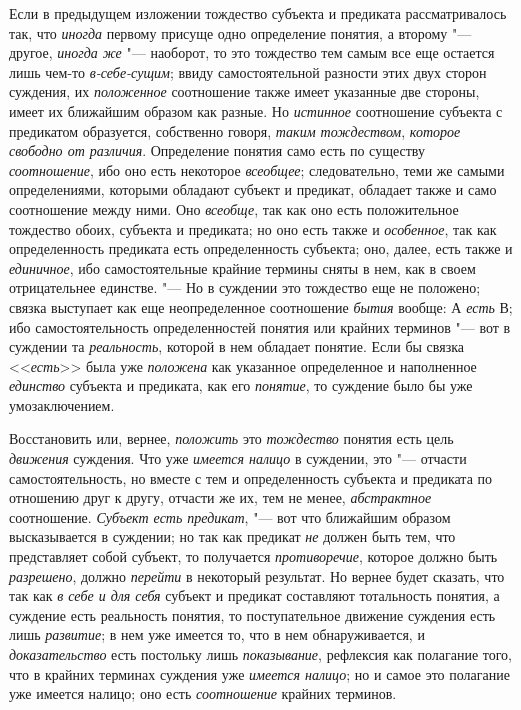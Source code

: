 Если в предыдущем изложении тождество субъекта и предиката
рассматривалось так, что {\em иногда}
первому присуще одно определение понятия, а второму
"--- другое, {\em иногда же}
"--- наоборот, то это тождество тем самым все еще остается лишь
чем-то {\em в-себе-сущим};
ввиду самостоятельной разности этих двух сторон суждения, их
{\em положенное}
соотношение также имеет указанные две стороны, имеет их
ближайшим образом как разные. Но
{\em истинное}
соотношение субъекта с предикатом образуется, собственно
говоря, {\em таким тождеством},
{\em которое свободно от различия}.
Определение понятия само есть по существу
{\em соотношение}, ибо
оно есть некоторое {\em всеобщее};
следовательно, теми же самыми определениями, которыми
обладают субъект и предикат, обладает также и само соотношение между ними.
Оно {\em всеобще}, так
как оно есть положительное тождество обоих, субъекта и предиката; но оно
есть также и
{\em особенное},
так как определенность предиката есть определенность
субъекта; оно, далее, есть также и
{\em единичное}, ибо
самостоятельные крайние термины сняты в нем, как в своем отрицательнее
единстве. "--- Но в суждении это тождество еще не положено;
связка выступает как еще неопределенное соотношение
{\em бытия} вообще: А
{\em есть} В; ибо
самостоятельность определенностей понятия или крайних терминов
"--- вот в суждении та
{\em реальность}, которой
в нем обладает понятие. Если бы связка
<<{\em есть}>> была уже
{\em положена} как
указанное определенное и наполненное
{\em единство} субъекта и
предиката, как его {\em понятие},
то суждение было бы уже умозаключением.

Восстановить или, вернее,
{\em положить} это
{\em тождество} понятия
есть цель {\em движения}
суждения. Что уже
{\em имеется налицо }в
суждении, это "--- отчасти самостоятельность, но вместе с тем и
определенность субъекта и предиката по отношению друг к другу, отчасти же
их, тем не менее, {\em абстрактное}
соотношение. {\em Субъект
есть предикат}, "--- вот что ближайшим образом высказывается в
суждении; но так как предикат {\em не}
должен быть тем, что представляет собой субъект, то
получается {\em противоречие},
которое должно быть
{\em разрешено}, должно
{\em перейти} в некоторый
результат. Но вернее будет сказать, что так как
{\em в себе и для себя}
субъект и предикат составляют тотальность понятия, а суждение
есть реальность понятия, то поступательное движение суждения есть лишь
{\em развитие}; в нем уже
имеется то, что в нем обнаруживается, и
{\em доказательство} есть
постольку лишь {\em показывание},
рефлексия как полагание того, что в крайних
терминах суждения уже
{\em имеется налицо}; но
и самое это полагание уже имеется налицо; оно есть
{\em соотношение} крайних
терминов.

